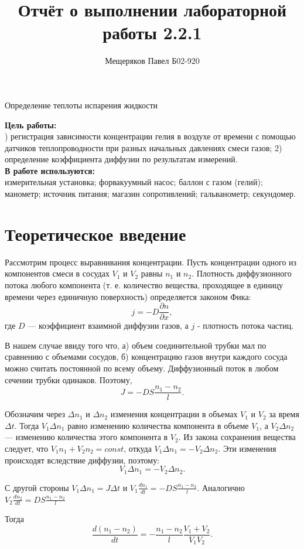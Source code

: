 \documentclass[a4paper,12pt]{article}
\author{Мещеряков Павел Б02-920}
\title{Отчёт о выполнении лабораторной работы 2.2.1}
\begin{document}
	\maketitle
	\begin{center}
		{\Large Определение теплоты испарения жидкости}
	\end{center}
\noindent \textbf{Цель работы:} \\
)  регистрация  зависимости  концентрации   гелия в воздухе от времени с помощью датчиков теплопроводности при разных начальных давлениях смеси газов; 2) определение коэффициента диффузии по результатам измерений.\\
\noindent \textbf{В работе используются:} \\
\indent измерительная установка; форвакуумный насос; баллон с газом (гелий); манометр; источник питания; магазин сопротивлений; гальванометр; секундомер.

\section*{Теоретическое введение}
Рассмотрим процесс выравнивания концентрации. Пусть концентрации одного из компонентов смеси в сосудах $V_1$ и $V_2$ равны $n_1$ и
$n_2$. Плотность диффузионного потока любого компонента (т. е. количество вещества, проходящее в единицу времени через единичную поверхность) определяется законом Фика:
$$j=-D\frac{\partial n}{\partial x},$$ где $D$ — коэффициент взаимной диффузии газов, а $j$ - плотность потока частиц.

В нашем случае ввиду того что, а) объем соединительной трубки мал по сравнению с объемами сосудов, б) концентрацию газов внутри каждого сосуда можно считать постоянной по всему объему. Диффузионный поток в любом сечении трубки одинаков. Поэтому, $$J=-DS\frac{n_1-n_2}{l}.$$

Обозначим через $\Delta n_1$ и $\Delta n_2$ изменения концентрации в объемах
$V_1$ и $V_2$ за время $\Delta t$. Тогда $V_1 \Delta n_1$ равно изменению количества компонента в объеме $V_1$, а $V_2 \Delta n_2$ — изменению количества этого компонента в $V_2$. Из закона сохранения вещества следует, что $V_1n_1+V_2n_2 = const$, откуда $V_1 \Delta n_1 = -V_2\Delta n_2.$ Эти изменения происходят вследствие диффузии, поэтому: $$V_1\Delta n_1=-V_2\Delta n_2.$$

С другой стороны $V_1\Delta n_1=J\Delta t$ и $V_1\frac{dn_1}{dt}=-DS\frac{n_1-n_2}{l}.$ Аналогично $V_2\frac{dn_2}{dt}=DS\frac{n_1-n_2}{l}$

Тогда $$\frac{d(n_1-n_2)}{dt}=-\frac{n_1-n_2}{l} \frac{V_1+V_2}{V_1V_2}.$$
\end{document}
